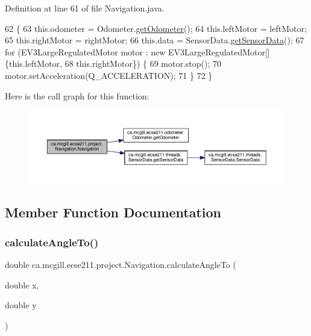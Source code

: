 Definition at line 61 of file Navigation.\+java.


\begin{DoxyCode}
62                                 \{
63     this.odometer = Odometer.\hyperlink{classca_1_1mcgill_1_1ecse211_1_1odometer_1_1_odometer_a99171f11e34dea918fa9dd069d721439}{getOdometer}();
64     this.leftMotor = leftMotor;
65     this.rightMotor = rightMotor;
66     this.data = SensorData.\hyperlink{classca_1_1mcgill_1_1ecse211_1_1threads_1_1_sensor_data_a8260aba53b4474ca1275e4ce26157977}{getSensorData}();
67     \textcolor{keywordflow}{for} (EV3LargeRegulatedMotor motor : \textcolor{keyword}{new} EV3LargeRegulatedMotor[] \{this.leftMotor,
68         this.rightMotor\}) \{
69       motor.stop();
70       motor.setAcceleration(Q\_ACCELERATION);
71     \}
72   \}
\end{DoxyCode}
Here is the call graph for this function\+:\nopagebreak
\begin{figure}[H]
\begin{center}
\leavevmode
\includegraphics[width=350pt]{classca_1_1mcgill_1_1ecse211_1_1project_1_1_navigation_aaee14b67c392ddd951e3ce21224c3e56_cgraph}
\end{center}
\end{figure}


\subsection{Member Function Documentation}
\mbox{\label{classca_1_1mcgill_1_1ecse211_1_1project_1_1_navigation_a4376e54162df8f123ca3b52e4fd2f38d}} 
\subsubsection{\texorpdfstring{calculate\+Angle\+To()}{calculateAngleTo()}}
{\footnotesize\ttfamily double ca.\+mcgill.\+ecse211.\+project.\+Navigation.\+calculate\+Angle\+To (\begin{DoxyParamCaption}\item[{double}]{x,  }\item[{double}]{y }\end{DoxyParamCaption})}

